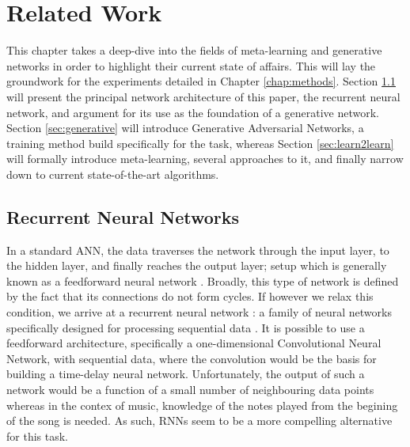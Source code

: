 \documentclass[a4paper]{book}
\begin{document}
\chapter{Related Work}\label{chap:theoretical_framework}

This chapter takes a deep-dive into the fields of meta-learning and generative networks in order to highlight their current state of affairs. This will lay the groundwork for the experiments detailed in Chapter \ref{chap:methods}. Section \ref{sec:rnn} will present the principal network architecture of this paper, the recurrent neural network, and argument for its use as the foundation of a generative network. Section \ref{sec:generative} will introduce Generative Adversarial Networks, a training method build specifically for the task, whereas Section \ref{sec:learn2learn} will formally introduce meta-learning, several approaches to it, and finally narrow down to current state-of-the-art algorithms. 

\section{Recurrent Neural Networks} \label{sec:rnn}

In a standard ANN, the data traverses the network through the input layer, to the hidden layer, and finally reaches the output layer; setup which is generally known as a feedforward neural network \parencite[Figure \ref{fig:feedforward_net};][]{graves_supervised_2012}. Broadly, this type of network is defined by the fact that its connections do not form cycles. If however we relax this condition, we arrive at a recurrent neural network \parencite[Figure \ref{fig:rnn_folded};][]{rumelhart_learning_1986}: a family of neural networks specifically designed for processing sequential data \parencite{goodfellow_deep_2016}. It is possible to use a feedforward architecture, specifically a one-dimensional Convolutional Neural Network, with sequential data, where the convolution would be the basis for building a time-delay neural network. Unfortunately, the output of such a network would be a function of a small number of neighbouring data points \parencite[say, the last three notes;][]{goodfellow_deep_2016} whereas in the contex of music, knowledge of the notes played from the begining of the song is needed. As such, RNNs seem to be a more compelling alternative for this task.
\end{document}
